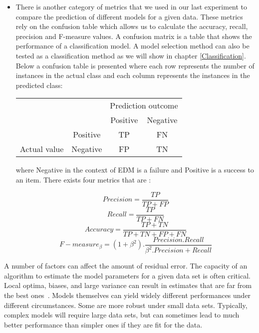 \begin{itemize}
\item There is another category of metrics that we used in our last experiment to compare the prediction of different models for a given data. These metrics rely on the confusion table which allows us to calculate the accuracy, recall, precision and F-measure values. A confusion matrix is a table that shows the performance of a classification model. A model selection method can also be tested as a classification method as we will show in chapter \ref{Classification}. Below a confusion table is presented where each row represents the number of instances in the actual class and each column represents the instances in the predicted class:


\begin{center}
\begin{tabular}{c|c|c|c|}
\multicolumn{2}{c}{}&\multicolumn{2}{c}{Prediction outcome}\tabularnewline
\cline{3-4}
\multicolumn{2}{c|}{}& \multicolumn{1}{c|}{Positive} & \multicolumn{1}{c|}{Negative} \tabularnewline
\cline{2-4}
&  \multicolumn{1}{c|}{Positive }&TP&FN\tabularnewline
\cline{2-4}
\multirow{-2}{*}{Actual value}& \multicolumn{1}{c|}{Negative} &FP&TN\tabularnewline
\cline{2-4}
\end{tabular}

\end{center}


\quad

where Negative in the context of EDM is a failure and Positive is a success to an item. There exists four metrics that are :

\begin{center}
\[Precision = \frac{TP}{TP+FP}\]
\[Recall = \frac{TP}{TP+FN}\]
\[Accuracy = \frac{TP+TN}{TP+TN+FP+FN}\]
\[F-measure_\beta = (1+\beta^2).\frac{Precision.Recall}{\beta^2.Precision+Recall}\]
\end{center}

\quad


\end{itemize}

A number of factors can affect the amount of residual error.  The capacity of an algorithm to estimate the model parameters for a given data set is often critical.  Local optima, biases, and large variance can result in estimates that are far from the best ones~\cite{hastie2005elements}.  Models themselves can yield widely different performances under different circumstances.  Some are more robust under small data sets.  Typically, complex models will require large data sets, but can sometimes lead to much better performance than simpler ones if they are fit for the data.


